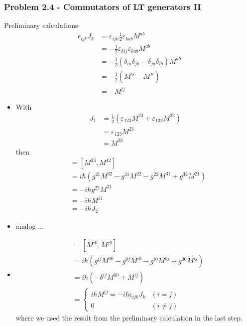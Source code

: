 \documentclass[10pt,a4paper]{book}
\theoremstyle{definition}
\begin{document}
\subsubsection{Problem 2.4 - Commutators of LT generators II}
Preliminary calculations
\begin{align}
\epsilon_{ijk}J_k
&=\varepsilon_{ijk}\frac{1}{2}\varepsilon_{kab}M^{ab}\\
&=-\frac{1}{2}\varepsilon_{kij}\varepsilon_{kab}M^{ab}\\
&=-\frac{1}{2}\left(\delta_{ia}\delta_{jb}-\delta_{ja}\delta_{ib}\right)M^{ab}\\
&=-\frac{1}{2}\left(M^{ij}-M^{ji}\right)\\
&=-M^{ij}
\end{align}
\begin{itemize}
\item  With
\begin{align}
J_1
&=\frac{1}{2}(\varepsilon_{123}M^{23}+\varepsilon_{132}M^{32})\\
&=\varepsilon_{123}M^{23}\\
&=M^{23}
\end{align}
then
\begin{align}
[J_1,J_3]
&=[M^{23},M^{12}]\\
&=i\hbar\left(g^{21}M^{32}-g^{31}M^{22}-g^{22}M^{31}+g^{32}M^{21}\right)\\
&=-i\hbar g^{22}M^{31}\\
&=-i\hbar M^{31}\\
&=-i\hbar J_2
\end{align}
\item analog ...
\item
\begin{align}
[K^i,K^j]
&=[M^{i0},M^{j0}]\\
&=i\hbar\left(g^{ij}M^{00}-g^{0j}M^{i0}-g^{i0}M^{0j}+g^{00}M^{ij}\right)\\
&=i\hbar\left(-\delta^{ij}M^{00}+M^{ij}\right) \\
&=\left\{
\begin{array}{ll} 
i\hbar M^{ij}=-i\hbar\epsilon_{ijk}J_k 	& (i=j)\\
 0 										& (i\neq j)
\end{array}\right.
\end{align}
where we used the result from the preliminary calculation in the last step.
\end{itemize}
\end{document}
